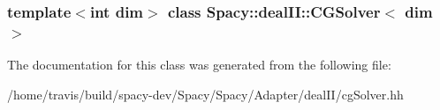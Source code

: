 \subsubsection*{template$<$int dim$>$ class Spacy\-::deal\-I\-I\-::\-C\-G\-Solver$<$ dim $>$}



\-The documentation for this class was generated from the following file\-:\begin{DoxyCompactItemize}
\item 
/home/travis/build/spacy-\/dev/\-Spacy/\-Spacy/\-Adapter/deal\-I\-I/cg\-Solver.\-hh\end{DoxyCompactItemize}
